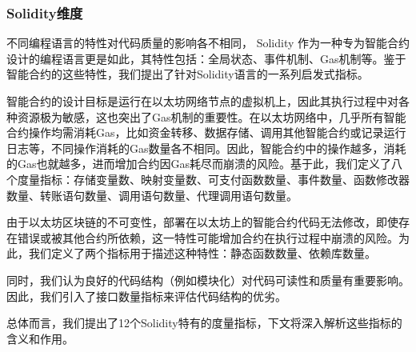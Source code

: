 \subsubsection{Solidity维度}
不同编程语言的特性对代码质量的影响各不相同， Solidity 作为一种专为智能合约设计的编程语言更是如此，其特性包括：全局状态、事件机制、Gas机制等。鉴于智能合约的这些特性，我们提出了针对Solidity语言的一系列启发式指标。

智能合约的设计目标是运行在以太坊网络节点的虚拟机上，因此其执行过程中对各种资源极为敏感，这也突出了Gas机制的重要性。在以太坊网络中，几乎所有智能合约操作均需消耗Gas，比如资金转移、数据存储、调用其他智能合约或记录运行日志等，不同操作消耗的Gas数量各不相同。因此，智能合约中的操作越多，消耗的Gas也就越多，进而增加合约因Gas耗尽而崩溃的风险。基于此，我们定义了八个度量指标：存储变量数、映射变量数、可支付函数数量、事件数量、函数修改器数量、转账语句数量、调用语句数量、代理调用语句数量。

由于以太坊区块链的不可变性，部署在以太坊上的智能合约代码无法修改，即使存在错误或被其他合约所依赖，这一特性可能增加合约在执行过程中崩溃的风险。为此，我们定义了两个指标用于描述这种特性：静态函数数量、依赖库数量。

同时，我们认为良好的代码结构（例如模块化）对代码可读性和质量有重要影响。因此，我们引入了接口数量指标来评估代码结构的优劣。

总体而言，我们提出了12个Solidity特有的度量指标，下文将深入解析这些指标的含义和作用。

